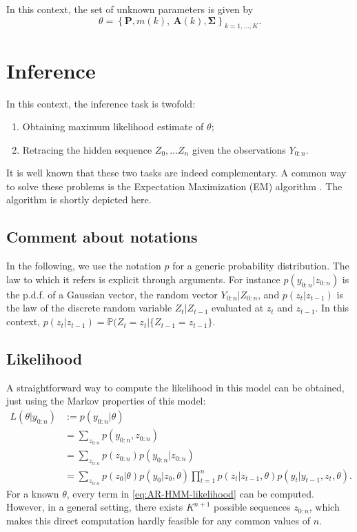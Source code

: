 \documentclass[]{book}
\providecommand{\tightlist}{%
  \setlength{\itemsep}{0pt}\setlength{\parskip}{0pt}}
\begin{document}
In this context, the set of unknown parameters is given by
\[\theta = \left\lbrace \mathbf{P}, m(k),~\mathbf{A}(k), \mathbf{\Sigma}\right \rbrace_{k = 1,\dots, K}.\]

\hypertarget{inference-1}{%
\section{Inference}\label{inference-1}}

In this context, the inference task is twofold:

\begin{enumerate}
\def\labelenumi{\arabic{enumi}.}
\tightlist
\item
  Obtaining maximum likelihood estimate of \(\theta\);
\item
  Retracing the hidden sequence \(Z_0,\dots Z_n\) given the observations \(Y_{0:n}\).
\end{enumerate}

It is well known that these two tasks are indeed complementary.
A common way to solve these problems is the Expectation Maximization (EM) algorithm
\citep{dempster1977maximum}.
The algorithm is shortly depicted here.

\hypertarget{comment-about-notations}{%
\subsection{Comment about notations}\label{comment-about-notations}}

In the following, we use the notation \(p\) for a generic probability distribution. The law to which it refers is explicit through arguments. For instance \(p(y_{0:n} \vert z_{0:n})\) is the p.d.f. of a Gaussian vector, the random vector \(Y_{0:n}\vert Z_{0:n}\), and \(p(z_t\vert z_{t - 1})\) is the law of the discrete random variable \(Z_{t} \vert Z_{t - 1}\) evaluated at \(z_t\) and \(z_{t -1}\).
In this context, \(p(z_t\vert z_{t - 1}) = \mathbb{P}(Z_t = z_t \vert \lbrace Z_{t-1} = z_{t -1}\rbrace.\)

\hypertarget{likelihood}{%
\subsection{Likelihood}\label{likelihood}}

A straightforward way to compute the likelihood in this model can be obtained, just using the Markov properties of this model:
\begin{align}
L(\theta \vert y_{0:n}) &:= p(y_{0:n} \vert \theta) \nonumber \\
&= \sum_{z_{0:n}} p(y_{0:n}, z_{0:n}) \nonumber \\
&= \sum_{z_{0:n}} p(z_{0:n})p(y_{0:n}\vert z_{0:n}) \nonumber \\
&=  \sum_{z_{0:n}} p(z_0 \vert \theta) p(y_0\vert z_0, \theta) \prod_{t = 1}^n p(z_{t} \vert z_{t - 1}, \theta)p(y_{t}\vert y_{t -1}, z_{t}, \theta)  \label{eq:AR-HMM-likelihood}.
\end{align}
For a known \(\theta\), every term in \eqref{eq:AR-HMM-likelihood} can be computed.
However, in a general setting, there exists \(K^{n + 1}\) possible sequences \(z_{0:n}\), which makes this direct computation hardly feasible for any common values of \(n\).
\end{document}
